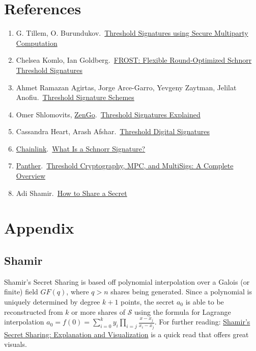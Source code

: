 \documentclass[12pt]{article}
\begin{document}
\section*{References}
\begin{enumerate}
    \renewcommand{\labelenumi}{[\Alph{enumi}]}
    \item G. Tillem, O. Burundukov.\ \href{https://www.ingwb.com/binaries/content/assets/insights/themes/distributed-ledger-technology/ing-releases-multiparty-threshold-signing-library-to-improve-customer-security/threshold-signatures-using-secure-multiparty-computation.pdf}{Threshold Signatures using Secure Multiparty Computation}
    \item Chelsea Komlo, Ian Goldberg.\ \href{https://eprint.iacr.org/2020/852.pdf}{FROST: Flexible Round-Optimized
    Schnorr Threshold Signatures}
    \item Ahmet Ramazan Agirtas, Jorge Arce-Garro, Yevgeny Zaytman, Jelilat Anofiu.\ \href{https://medium.com/nethermind-eth/threshold-signature-schemes-36f40bc42aca#5417}{Threshold Signature Schemes}
    \item Omer Shlomovits, \href{https://zengo.com/}{ZenGo}.\ \href{https://academy.binance.com/en/articles/threshold-signatures-explained#header-5}{Threshold Signatures Explained}
    \item Cassandra Heart, Arash Afshar.\ \href{https://www.coinbase.com/blog/threshold-digital-signatures}{Threshold Digital Signatures}
    \item \href{https://blog.chain.link/author/chainlink/}{Chainlink}.\ \href{https://blog.chain.link/schnorr-signature/}{What Is a Schnorr Signature?}
    \item \href{https://blog.pantherprotocol.io/author/pantherteam/}{Panther}.\ \href{https://blog.pantherprotocol.io/threshold-cryptography-an-overview/}{Threshold Cryptography, MPC, and MultiSigs: A Complete Overview}
    \item Adi Shamir.\ \href{https://dl.acm.org/doi/pdf/10.1145/359168.359176}{How to Share a Secret}
\end{enumerate}

\appendix
\section{Appendix}
\subsection{Shamir}\label{subsec:shamir}
Shamir's Secret Sharing is based off polynomial interpolation over a Galois (or finite) field \( GF(q)\), where \(q > n\) shares being generated. Since a polynomial is uniquely determined by degree \(k+1\) points, the secret \(a_0\) is able to be reconstructed from \(k\) or more shares of \( \mathcal{S}\) using the formula for Lagrange interpolation \(a_0 = f(0)= \sum_{i=0}^{k}y_i \prod_{i=j} \frac{x-x_j}{x_i-x_j}\). For further reading: \href{https://evervault.com/blog/shamir-secret-sharing}{Shamir's Secret Sharing: Explanation and Visualization} is a quick read that offers great visuals.
\end{document}

